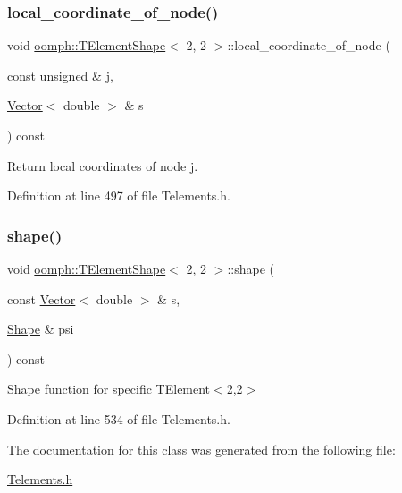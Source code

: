 \subsubsection{\texorpdfstring{local\+\_\+coordinate\+\_\+of\+\_\+node()}{local\_coordinate\_of\_node()}}
{\footnotesize\ttfamily void \hyperlink{classoomph_1_1TElementShape}{oomph\+::\+T\+Element\+Shape}$<$ 2, 2 $>$\+::local\+\_\+coordinate\+\_\+of\+\_\+node (\begin{DoxyParamCaption}\item[{const unsigned \&}]{j,  }\item[{\hyperlink{classoomph_1_1Vector}{Vector}$<$ double $>$ \&}]{s }\end{DoxyParamCaption}) const\hspace{0.3cm}{\ttfamily [inline]}}



Return local coordinates of node j. 



Definition at line 497 of file Telements.\+h.

\mbox{\label{classoomph_1_1TElementShape_3_012_00_012_01_4_a6c10a285d1008251cd8a6cb6cd58411d}} 
\subsubsection{\texorpdfstring{shape()}{shape()}}
{\footnotesize\ttfamily void \hyperlink{classoomph_1_1TElementShape}{oomph\+::\+T\+Element\+Shape}$<$ 2, 2 $>$\+::shape (\begin{DoxyParamCaption}\item[{const \hyperlink{classoomph_1_1Vector}{Vector}$<$ double $>$ \&}]{s,  }\item[{\hyperlink{classoomph_1_1Shape}{Shape} \&}]{psi }\end{DoxyParamCaption}) const\hspace{0.3cm}{\ttfamily [inline]}}



\hyperlink{classoomph_1_1Shape}{Shape} function for specific T\+Element$<$2,2$>$ 



Definition at line 534 of file Telements.\+h.



The documentation for this class was generated from the following file\+:\begin{DoxyCompactItemize}
\item 
\hyperlink{Telements_8h}{Telements.\+h}\end{DoxyCompactItemize}
